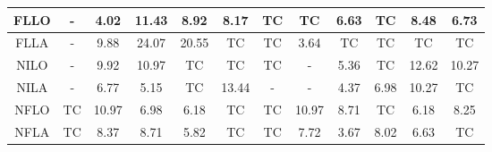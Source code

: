 \begin{table}[]
\begin{tabular}{|c|ccccccccccc|}
		FLLO & \multicolumn{1}{c|}{\cellcolor[HTML]{FFCCC9}-} & \multicolumn{1}{c|}{4.02} & \multicolumn{1}{c|}{11.43} & \multicolumn{1}{c|}{8.92} & \multicolumn{1}{c|}{8.17} & \multicolumn{1}{c|}{\cellcolor[HTML]{FFFFC7}TC} & \multicolumn{1}{c|}{\cellcolor[HTML]{FFFFC7}TC} & \multicolumn{1}{c|}{6.63} & \multicolumn{1}{c|}{\cellcolor[HTML]{FFFFC7}TC} & \multicolumn{1}{c|}{8.48} & 6.73 \\ \hline
		FLLA & \multicolumn{1}{c|}{\cellcolor[HTML]{FFCCC9}-} & \multicolumn{1}{c|}{9.88} & \multicolumn{1}{c|}{24.07} & \multicolumn{1}{c|}{20.55} & \multicolumn{1}{c|}{\cellcolor[HTML]{FFFFC7}TC} & \multicolumn{1}{c|}{\cellcolor[HTML]{FFFFC7}TC} & \multicolumn{1}{c|}{3.64} & \multicolumn{1}{c|}{\cellcolor[HTML]{FFFFC7}TC} & \multicolumn{1}{c|}{\cellcolor[HTML]{FFFFC7}TC} & \multicolumn{1}{c|}{\cellcolor[HTML]{FFFFC7}TC} & \cellcolor[HTML]{FFFFC7}TC \\ \hline
		NILO & \multicolumn{1}{c|}{\cellcolor[HTML]{FFCCC9}-} & \multicolumn{1}{c|}{9.92} & \multicolumn{1}{c|}{10.97} & \multicolumn{1}{c|}{\cellcolor[HTML]{FFFFC7}TC} & \multicolumn{1}{c|}{\cellcolor[HTML]{FFFFC7}TC} & \multicolumn{1}{c|}{\cellcolor[HTML]{FFFFC7}TC} & \multicolumn{1}{c|}{\cellcolor[HTML]{FFCCC9}-} & \multicolumn{1}{c|}{5.36} & \multicolumn{1}{c|}{\cellcolor[HTML]{FFFFC7}TC} & \multicolumn{1}{c|}{12.62} & 10.27 \\ \hline
		NILA & \multicolumn{1}{c|}{\cellcolor[HTML]{FFCCC9}-} & \multicolumn{1}{c|}{6.77} & \multicolumn{1}{c|}{5.15} & \multicolumn{1}{c|}{\cellcolor[HTML]{FFFFC7}TC} & \multicolumn{1}{c|}{13.44} & \multicolumn{1}{c|}{\cellcolor[HTML]{FFCCC9}-} & \multicolumn{1}{c|}{\cellcolor[HTML]{FFCCC9}-} & \multicolumn{1}{c|}{4.37} & \multicolumn{1}{c|}{6.98} & \multicolumn{1}{c|}{10.27} & \cellcolor[HTML]{FFFFC7}TC \\ \hline
		NFLO & \multicolumn{1}{c|}{\cellcolor[HTML]{FFFFC7}TC} & \multicolumn{1}{c|}{10.97} & \multicolumn{1}{c|}{6.98} & \multicolumn{1}{c|}{6.18} & \multicolumn{1}{c|}{\cellcolor[HTML]{FFFFC7}TC} & \multicolumn{1}{c|}{\cellcolor[HTML]{FFFFC7}TC} & \multicolumn{1}{c|}{10.97} & \multicolumn{1}{c|}{8.71} & \multicolumn{1}{c|}{\cellcolor[HTML]{FFFFC7}TC} & \multicolumn{1}{c|}{6.18} & 8.25 \\ \hline
		NFLA & \multicolumn{1}{c|}{\cellcolor[HTML]{FFFFC7}TC} & \multicolumn{1}{c|}{8.37} & \multicolumn{1}{c|}{8.71} & \multicolumn{1}{c|}{5.82} & \multicolumn{1}{c|}{\cellcolor[HTML]{FFFFC7}TC} & \multicolumn{1}{c|}{\cellcolor[HTML]{FFFFC7}TC} & \multicolumn{1}{c|}{7.72} & \multicolumn{1}{c|}{3.67} & \multicolumn{1}{c|}{8.02} & \multicolumn{1}{c|}{6.63} & \cellcolor[HTML]{FFFFC7}TC \\ \hline

\end{tabular}
\end{table}
